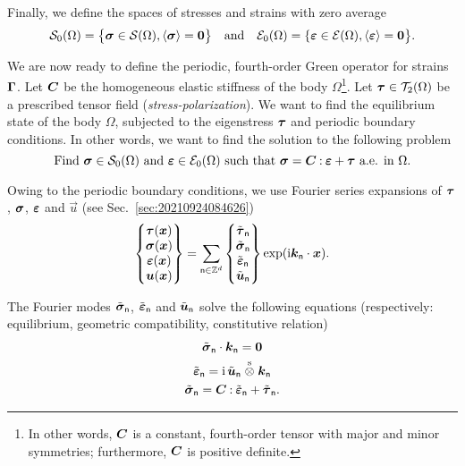 Finally, we define the spaces of stresses and strains with zero average
\begin{equation}
  \mathcal S_0(\Omega)=\bigl\{\boldsymbol\sigma\in\mathcal S(\Omega),
  \langle\boldsymbol\sigma\rangle=\boldsymbol0\bigr\}
  \quad\text{and}\quad
  \mathcal E_0(\Omega)=\{\boldsymbol\varepsilon\in\mathcal E(\Omega),
  \langle\boldsymbol\varepsilon\rangle=\boldsymbol0\bigr\}.
\end{equation}

We are now ready to define the periodic, fourth-order Green operator for strains
\(\boldsymbol\Gamma\). Let \(\boldsymbol C\) be the homogeneous elastic stiffness of the
body \(\Omega\)\footnote{In other words, \(\boldsymbol C\) is a constant, fourth-order
  tensor with major and minor symmetries; furthermore, \(\boldsymbol C\) is positive
  definite.}. Let \(\boldsymbol\tau\in\mathcal T_2(\Omega)\) be a prescribed tensor
field (\emph{stress-polarization}). We want to find the equilibrium state of the
body \(\Omega\), subjected to the eigenstress \(\boldsymbol\tau\) and periodic boundary
conditions. In other words, we want to find the solution to the following
problem
\begin{equation}
  \text{Find }\boldsymbol\sigma\in\mathcal S_0(\Omega)
  \text{ and }\boldsymbol\varepsilon\in\mathcal E_0(\Omega)
  \text{ such that }\boldsymbol\sigma=\boldsymbol C\mathbin{\mathord{:}}\boldsymbol\varepsilon+\boldsymbol\tau
  \text{ a.e. in }\Omega.
\end{equation}

Owing to the periodic boundary conditions, we use Fourier series expansions of
\(\boldsymbol\tau\), \(\boldsymbol\sigma\), \(\boldsymbol\varepsilon\) and \(\vec u\) (see
Sec.~\ref{sec:20210924084626})
\begin{equation}
  \begin{Bmatrix}
    \boldsymbol\tau(\boldsymbol x)\\
    \boldsymbol\sigma(\boldsymbol x)\\
    \boldsymbol\varepsilon(\boldsymbol x)\\
    \boldsymbol u(\boldsymbol x)
  \end{Bmatrix}
  =\sum_{\mathsf{n}\in\mathbb Z^d}
  \begin{Bmatrix}
    \tilde{\boldsymbol\tau}_\mathsf{n}\\
    \tilde{\boldsymbol\sigma}_\mathsf{n}\\
    \tilde{\boldsymbol\varepsilon}_\mathsf{n}\\
    \tilde{\boldsymbol u}_\mathsf{n}
  \end{Bmatrix}
  \exp(\mathrm i \boldsymbol k_\mathsf{n}\cdot\boldsymbol x).
\end{equation}

The Fourier modes \(\tilde{\boldsymbol\sigma}_\mathsf{n}\),
\(\tilde{\boldsymbol\varepsilon}_\mathsf{n}\) and \(\tilde{\boldsymbol u}_\mathsf{n}\) solve
the following equations (respectively: equilibrium, geometric compatibility,
constitutive relation)
\begin{gather}
  \label{eq:20210927092532}
  \tilde{\boldsymbol\sigma}_\mathsf{n}\cdot\boldsymbol k_\mathsf{n}=\boldsymbol 0\\
  \label{eq:20210927092538}
  \tilde{\boldsymbol\varepsilon}_\mathsf{n}
  =\mathrm i\,\tilde{\boldsymbol u}_\mathsf{n}\stackrel{\mathrm{s}}{\otimes}\boldsymbol k_\mathsf{n}\\
  \label{eq:20210927092543}
  \tilde{\boldsymbol\sigma}_\mathsf{n}=\boldsymbol C\mathbin{\mathord{:}}\tilde{\boldsymbol\varepsilon}_\mathsf{n}
  +\tilde{\boldsymbol\tau}_\mathsf{n}.
\end{gather}

